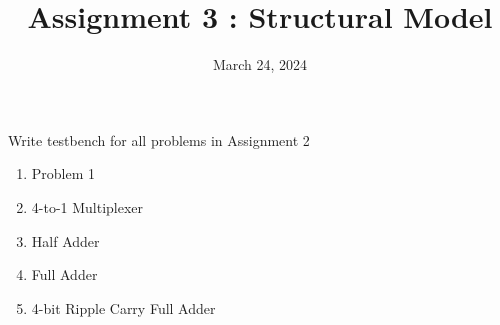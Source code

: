 \documentclass{vhdl-assignment}
\title{Assignment 3 : Structural Model}
\date{March 24, 2024}
\begin{document}
\maketitle
\thispagestyle{fancy}

\begin{problem}{Write testbench for all problems in Assignment 2}
    \begin{enumerate}
        \item Problem 1 
        \item 4-to-1 Multiplexer
        \item Half Adder
        \item Full Adder
        \item 4-bit Ripple Carry Full Adder
    \end{enumerate}
\end{problem}
\end{document}
